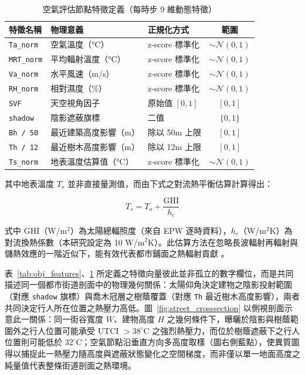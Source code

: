 \begin{table}[htbp]
    \centering
    \caption{空氣評估節點特徵定義（每時步 9 維動態特徵）}
    \label{tab:air_features}
    \small
    \begin{tabular}{lllc}
        \toprule
        \textbf{特徵名稱} & \textbf{物理意義} & \textbf{正規化方式} & \textbf{範圍} \\
        \midrule
        \texttt{Ta\_norm}   & 空氣溫度（°C）             & z-score 標準化  & $\sim\mathcal{N}(0,1)$ \\
        \texttt{MRT\_norm}  & 平均輻射溫度（°C）         & z-score 標準化  & $\sim\mathcal{N}(0,1)$ \\
        \texttt{Va\_norm}   & 水平風速（m/s）            & z-score 標準化  & $\sim\mathcal{N}(0,1)$ \\
        \texttt{RH\_norm}   & 相對濕度（\%）             & z-score 標準化  & $\sim\mathcal{N}(0,1)$ \\
        \texttt{SVF}        & 天空視角因子              & 原始值 $[0,1]$ & $[0, 1]$ \\
        \texttt{shadow}     & 陰影遮蔽旗標              & 二值            & $\{0, 1\}$ \\
        \texttt{Bh / 50}    & 最近建築高度影響（m）      & 除以 50m 上限   & $[0, 1]$ \\
        \texttt{Th / 12}    & 最近樹木高度影響（m）      & 除以 12m 上限   & $[0, 1]$ \\
        \texttt{Ts\_norm}   & 地表溫度估算值（°C）       & z-score 標準化  & $\sim\mathcal{N}(0,1)$ \\
        \bottomrule
    \end{tabular}
\end{table}

其中地表溫度 $T_s$ 並非直接量測值，而由下式之對流熱平衡估算計算得出：

\begin{equation}
    T_s = T_a + \frac{\text{GHI}}{h_c}
    \label{eq:surface_temp}
\end{equation}

式中 $\text{GHI}$（W/m$^2$）為太陽總輻照度（來自 EPW 逐時資料），$h_c$（W/m$^2$K）為對流換熱係數（本研究設定為 10 W/m$^2$K）。此估算方法在忽略長波輻射再輻射與儲熱效應的一階近似下，能有效代表都市鋪面之熱輻射貢獻 \citep{oke1988street}。

表~\ref{tab:obj_features}、\ref{tab:air_features} 所定義之特徵向量彼此並非孤立的數字欄位，而是共同描述同一個都市街道剖面中的物理幾何關係：太陽仰角決定建物之陰影投射範圍（對應 \texttt{shadow} 旗標）與喬木冠層之樹蔭覆蓋（對應 \texttt{Th} 最近樹木高度影響），兩者共同決定行人所在位置之熱壓力高低。圖~\ref{fig:street_crosssection} 以側視剖面示意此一關係：同一街谷寬度 $W$、建物高度 $H$ 之幾何條件下，曝曬於陰影與樹蔭範圍外之行人位置可能承受 UTCI $> 38^\circ\text{C}$ 之強烈熱壓力，而位於樹蔭遮蔽下之行人位置則可能低於 $32^\circ\text{C}$；空氣節點沿垂直方向多高度取樣（圖右側藍點），使異質圖得以捕捉此一熱壓力隨高度與遮蔽狀態變化之空間梯度，而非僅以單一地面高度之純量值代表整條街道剖面之熱環境。

